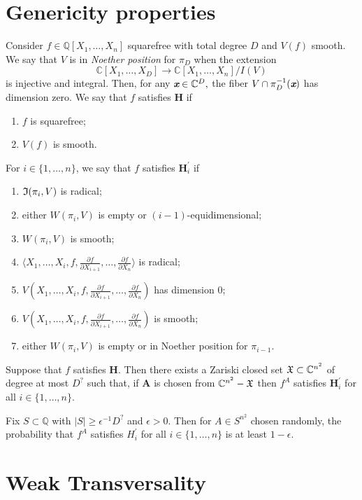 \documentclass[sigconf]{acmart}
\def\xb{\textit{\textbf{x}}}
\def\C{\mathbb{C}}
\def\pa{\partial}
\def\I{\frak{I}}
\begin{document}
\section{Genericity properties}
%
Consider $f \in \mathbb{Q}[X_1,\hdots,X_n]$ squarefree with total degree $D$ and $V(f)$ smooth. We say that $V$ is in \textit{Noether position} for $\pi_D$ when the extension 
\[
\C[X_1,\hdots,X_D] \rightarrow \C[X_1,\hdots,X_n]/I(V)
\] 
is injective and integral.  Then, for any $\xb \in \C^D,$ the fiber 
$V \cap \pi_D^{-1}(\xb)$ has dimension zero. 
We say that $f$ satisfies $\textbf{H}$ if 
%
\begin{enumerate}
    \item $f$ is squarefree;
    \item $V(f)$ is smooth.
\end{enumerate}
%
For $i\in\{1,\hdots,n\}$, we say that $f$ satisfies $\textbf{H}_i^{'}$ if 
%
\begin{enumerate}
\item $\I(\pi_i,V)$ is radical;
\item either $W(\pi_i,V)$ is empty or $(i-1)$-equidimensional;
\item $W(\pi_i,V)$ is smooth;
\item $\langle X_1,\hdots,X_i, f,  \frac{\pa f}{\pa X_{i+1}},\hdots,\frac{\pa f}{\pa X_n}\rangle $ is radical; 
\item $V(X_1,\hdots,X_i, f,  \frac{\pa f}{\pa X_{i+1}},\hdots,\frac{\pa f}{\pa X_n})$ has dimension $0$;
\item $V(X_1,\hdots,X_i, f,  \frac{\pa f}{\pa X_{i+1}},\hdots,\frac{\pa f}{\pa X_n})$ is smooth;
\item either $W(\pi_i,V)$ is empty or in Noether position for $\pi_{i-1}$.
\end{enumerate}
%
\begin{theorem}
Suppose that $f$ satisfies \textbf{H}. Then there exists a Zariski closed set $\frak{X} \subset \mathbb{C}^{n^2}$ of degree at most $D^{\textrm{?}}$ such that, if $\textbf{A}$ is chosen from  $\C^{n^2}-\frak{X}$ then $f^A$ satisfies $\textbf{H}_i^{'}$ for all $i \in \{1,\hdots,n\}.$
\end{theorem}
%
\begin{corollary} 
Fix $S \subset \mathbb{Q}$ with $|S| \geq \epsilon^{-1} D^{\textrm{?}}$ and $\epsilon > 0$. Then for $A\in S^{n^2}$ chosen randomly, the probability that $f^A$ satisfies $H_i^{'}$ for all $i \in \{1,\hdots,n\}$ is at least $1-\epsilon.$
\end{corollary}
%
%
%
%
\section{Weak Transversality}
\end{document}
